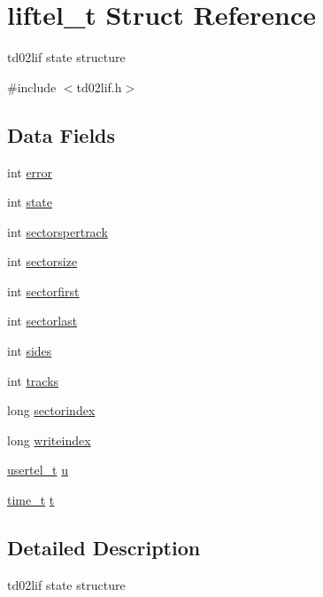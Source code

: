 \hypertarget{structliftel__t}{}\section{liftel\+\_\+t Struct Reference}
\label{structliftel__t}


td02lif state structure  




{\ttfamily \#include $<$td02lif.\+h$>$}

\subsection*{Data Fields}
\begin{DoxyCompactItemize}
\item 
int \hyperlink{structliftel__t_abc69ee3835be72037c41a11b7457cecd}{error}
\item 
int \hyperlink{structliftel__t_a579b9a2411fc6cf4bcdd4cac15d48e49}{state}
\item 
int \hyperlink{structliftel__t_a69b69f0cd2e8f0017178bafd5a7a7585}{sectorspertrack}
\item 
int \hyperlink{structliftel__t_aaf7b830b7b2791c56c83082bb9dba7d9}{sectorsize}
\item 
int \hyperlink{structliftel__t_a28dddd09745822ae834b073ad3c3bd98}{sectorfirst}
\item 
int \hyperlink{structliftel__t_aae9fb3e37531df4dfdf0b2906ec95026}{sectorlast}
\item 
int \hyperlink{structliftel__t_aabd804e27f6ab37de1ef9b890a0f1088}{sides}
\item 
int \hyperlink{structliftel__t_a24244c0ee111d3f46eedd7578eb1acf7}{tracks}
\item 
long \hyperlink{structliftel__t_a13e9f8b2e23d8f028f456d4465beb4d5}{sectorindex}
\item 
long \hyperlink{structliftel__t_a3c5f11408ea86ded8a0bc0d20a0ea689}{writeindex}
\item 
\hyperlink{structusertel__t}{usertel\+\_\+t} \hyperlink{structliftel__t_a3a8a41c9a51c6450ac562d525103902a}{u}
\item 
\hyperlink{time_8h_a3346b04b0420b32ccf6b706551b70762}{time\+\_\+t} \hyperlink{structliftel__t_a19ad0aafb060bc0262c7946220f0c407}{t}
\end{DoxyCompactItemize}


\subsection{Detailed Description}
td02lif state structure 

